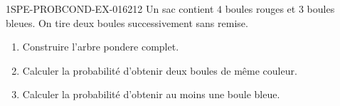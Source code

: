 \begin{exercice}{1SPE-PROBCOND-EX-016}{2}{12}
Un sac contient $4$ boules rouges et $3$ boules bleues. On tire deux boules successivement sans remise.

\begin{enumerate}
  \item Construire l'arbre pondere complet.
  \item Calculer la probabilité d'obtenir deux boules de même couleur.
  \item Calculer la probabilité d'obtenir au moins une boule bleue.
\end{enumerate}
\end{exercice}
